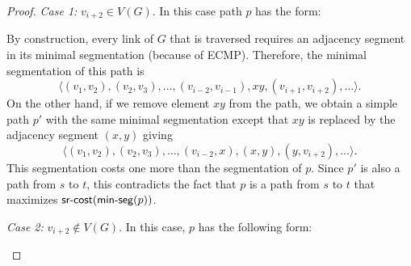 \begin{proof}
\emph{Case 1:} $v_{i + 2} \in V(G)$. In this case path $p$ has the form:

\begin{center}
\end{center}

By construction, every link of $G$ that is traversed requires an adjacency segment
in its minimal segmentation (because of ECMP). 
Therefore, the minimal segmentation of this path is 
$$
\langle (v_1, v_2), (v_2, v_3), \ldots, (v_{i - 2}, v_{i - 1}), xy, (v_{i + 1}, v_{i + 2}), \ldots \rangle.
$$
On the other hand, if we remove element $xy$ from the path, we obtain a simple path $p'$ with the same minimal segmentation
except that $xy$ is replaced by the adjacency segment $(x, y)$ giving
$$
\langle (v_1, v_2), (v_2, v_3), \ldots, (v_{i - 2}, x), (x, y), (y, v_{i + 2}), \ldots \rangle.
$$
This segmentation costs one more than the segmentation of $p$. Since $p'$ is also a path from $s$ to $t$, this 
contradicts the fact that $p$ is a path from $s$ to $t$ that maximizes $\textsf{sr-cost}(\textsf{min-seg}(p))$.

\emph{Case 2:} $v_{i + 2} \notin V(G)$. In this case, $p$ has the following form:

\begin{center}
\end{center}
\end{proof}
